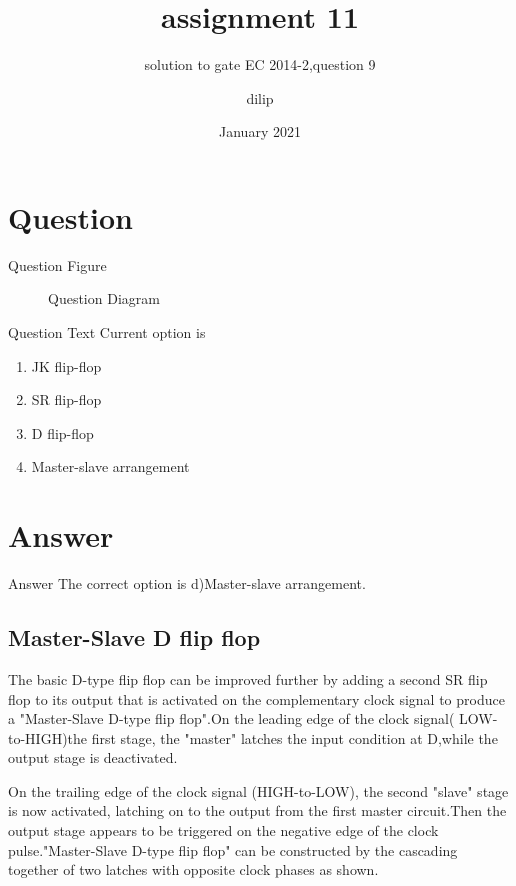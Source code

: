 \documentclass{beamer}
\title{assignment 11}
\subtitle{solution to gate EC 2014-2,question 9}
\author{dilip}
\date{January 2021}
\institute{IIIT RAICHUR}
\begin{document}
\begin{frame}
\maketitle
\end{frame}

\section{Question}
\begin{frame}{Question Figure}
  \begin{figure}[h]
    \centering
    \scalebox{0.65}{
    }
    \caption{Question Diagram}
    \label{fig:my_label}
\end{figure}
\end{frame}

\begin{frame}{Question Text}
Current option is
\begin{enumerate}[label=(\alph*)]
    \item JK flip-flop
    \item SR flip-flop
    \item D flip-flop
    \item Master-slave arrangement
\end{enumerate}
\end{frame}

\section{Answer}
\begin{frame}{Answer} 
 The correct option is d)Master-slave arrangement.
 \end{frame}
 \subsection{Master-Slave D flip flop}
 \begin{frame}
 The basic D-type flip flop can be improved further by adding a second SR flip flop to its output that is activated on the complementary clock signal to produce a "Master-Slave D-type flip flop".On the leading edge of the clock signal( LOW-to-HIGH)the first stage, the "master" latches the input condition at D,while the output stage is deactivated.
  \par
 On the trailing edge of the clock signal (HIGH-to-LOW), the second "slave" stage is now activated, latching on to the output from the first master circuit.Then the output stage appears to be triggered on the negative edge of the clock pulse."Master-Slave D-type flip flop" can be constructed by the cascading together of two latches with opposite clock phases as shown.
\end{frame}
\end{document}

